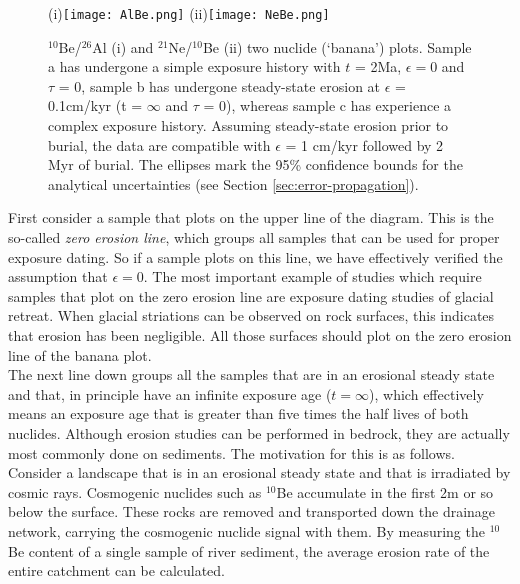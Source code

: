 \documentclass{book}
\newif\ifpdf
\begin{document}
\begin{figure}[!ht]
  \centering
  \ifpdf
  \def\svgwidth{.8\textwidth}
  ~~(i)~\\
  \def\svgwidth{.8\textwidth}
  (ii)
  \else
  (i)\texttt{[image: AlBe.png]}
  (ii)\texttt{[image: NeBe.png]}
  \fi
  \caption{$^{10}$Be/$^{26}$Al (i) and $^{21}$Ne/$^{10}$Be (ii) two
    nuclide (`banana') plots. Sample a has undergone a simple exposure
    history with $t$ = 2Ma, $\epsilon = 0$ and $\tau$ = 0, sample b has
    undergone steady-state erosion at $\epsilon$ = 0.1cm/kyr (t =
    $\infty$ and $\tau$ = 0), whereas sample c has experience a complex
    exposure history. Assuming steady-state erosion prior to burial, the
    data are compatible with $\epsilon$ = 1 cm/kyr followed by 2 Myr of
    burial. The ellipses mark the 95\% confidence bounds for the
    analytical uncertainties (see Section \ref{sec:error-propagation}).}
  \label{fig:banana}
\end{figure}

First consider a sample that plots on the upper line of the
diagram. This is the so-called \emph{zero erosion line}, which groups
all samples that can be used for proper exposure dating. So if a
sample plots on this line, we have effectively verified the assumption
that $\epsilon=0$.  The most important example of studies which
require samples that plot on the zero erosion line are exposure dating
studies of glacial retreat. When glacial striations can be observed on
rock surfaces, this indicates that erosion has been negligible. All
those surfaces should plot on the zero erosion line of the banana
plot.\\

The next line down groups all the samples that are in an erosional
steady state and that, in principle have an infinite exposure age
($t=\infty$), which effectively means an exposure age that is greater
than five times the half lives of both nuclides.  Although erosion
studies can be performed in bedrock, they are actually most commonly
done on sediments. The motivation for this is as follows. Consider a
landscape that is in an erosional steady state and that is irradiated
by cosmic rays. Cosmogenic nuclides such as $^{10}$Be accumulate in
the first 2m or so below the surface. These rocks are removed and
transported down the drainage network, carrying the cosmogenic nuclide
signal with them. By measuring the $^{10}$Be content of a single
sample of river sediment, the average erosion rate of the entire
catchment can be calculated.\\
\end{document}
